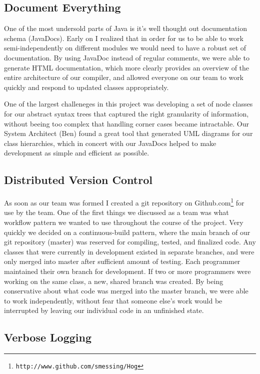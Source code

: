 \documentclass{book}
\begin{document}
\subsection{Document Everything}

One of the most undersold parts of Java is it's well thought out documentation
schema (JavaDocs). Early on I realized that in order for us to be able to work
semi-independently on different modules we would need to have a robust set of
documentation. By using JavaDoc instead of regular comments, we were able to
generate HTML documentation, which more clearly provides an overview of the entire
architecture of our compiler, and allowed everyone on our team to work quickly and
respond to updated classes appropriately.

One of the largest challeneges in this project was developing a set of node classes
for our abstract syntax trees that captured the right granularity of information,
without beeing too complex that handling corner cases became intractable. Our
System Architect (Ben) found a great tool that generated UML diagrams for our
class hierarchies, which in concert with our JavaDocs helped to make development
as simple and efficient as possible. 

\subsection{Distributed Version Control}

As soon as our team was formed I created a git repository on
Github.com\footnote{\texttt{http://www.github.com/smessing/Hog}} for use by the
team. One of the first things we discussed as a team was what workflow pattern
we wanted to use throughout the course of the project. Very quickly we decided
on a continuous-build pattern, where the main branch of our git repository 
(master) was reserved for compiling, tested, and finalized code. Any classes
that were currently in development existed in separate branches, and were only
merged into master after sufficient amount of testing. Each programmer maintained
their own branch for development. If two or more programmers were working on the
same class, a new, shared branch was created. By being conservative about what
code was merged into the master branch, we were able to work independently, without
fear that someone else's work would be interrupted by leaving our individual code
in an unfinished state. 

\subsection{Verbose Logging}
\end{document}
